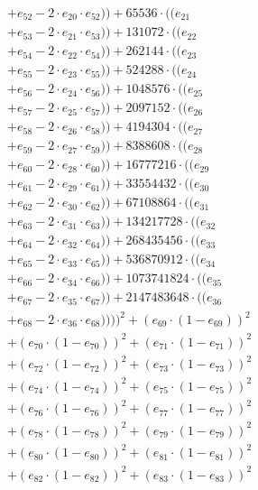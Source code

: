 \documentclass[10pt, a4paper]{article}
\begin{document}
\begin{align*}
& + e_{52} - 2 \cdot e_{20} \cdot e_{52})) + 65536 \cdot ((e_{21} \\
& + e_{53} - 2 \cdot e_{21} \cdot e_{53})) + 131072 \cdot ((e_{22} \\
& + e_{54} - 2 \cdot e_{22} \cdot e_{54})) + 262144 \cdot ((e_{23} \\
& + e_{55} - 2 \cdot e_{23} \cdot e_{55})) + 524288 \cdot ((e_{24} \\
& + e_{56} - 2 \cdot e_{24} \cdot e_{56})) + 1048576 \cdot ((e_{25} \\
& + e_{57} - 2 \cdot e_{25} \cdot e_{57})) + 2097152 \cdot ((e_{26} \\
& + e_{58} - 2 \cdot e_{26} \cdot e_{58})) + 4194304 \cdot ((e_{27} \\
& + e_{59} - 2 \cdot e_{27} \cdot e_{59})) + 8388608 \cdot ((e_{28} \\
& + e_{60} - 2 \cdot e_{28} \cdot e_{60})) + 16777216 \cdot ((e_{29} \\
& + e_{61} - 2 \cdot e_{29} \cdot e_{61})) + 33554432 \cdot ((e_{30} \\
& + e_{62} - 2 \cdot e_{30} \cdot e_{62})) + 67108864 \cdot ((e_{31} \\
& + e_{63} - 2 \cdot e_{31} \cdot e_{63})) + 134217728 \cdot ((e_{32} \\
& + e_{64} - 2 \cdot e_{32} \cdot e_{64})) + 268435456 \cdot ((e_{33} \\
& + e_{65} - 2 \cdot e_{33} \cdot e_{65})) + 536870912 \cdot ((e_{34} \\
& + e_{66} - 2 \cdot e_{34} \cdot e_{66})) + 1073741824 \cdot ((e_{35} \\
& + e_{67} - 2 \cdot e_{35} \cdot e_{67})) + 2147483648 \cdot ((e_{36} \\
& + e_{68} - 2 \cdot e_{36} \cdot e_{68}))))^{2} + (e_{69} \cdot (1 - e_{69}))^{2} \\
& + (e_{70} \cdot (1 - e_{70}))^{2} + (e_{71} \cdot (1 - e_{71}))^{2} \\
& + (e_{72} \cdot (1 - e_{72}))^{2} + (e_{73} \cdot (1 - e_{73}))^{2} \\
& + (e_{74} \cdot (1 - e_{74}))^{2} + (e_{75} \cdot (1 - e_{75}))^{2} \\
& + (e_{76} \cdot (1 - e_{76}))^{2} + (e_{77} \cdot (1 - e_{77}))^{2} \\
& + (e_{78} \cdot (1 - e_{78}))^{2} + (e_{79} \cdot (1 - e_{79}))^{2} \\
& + (e_{80} \cdot (1 - e_{80}))^{2} + (e_{81} \cdot (1 - e_{81}))^{2} \\
& + (e_{82} \cdot (1 - e_{82}))^{2} + (e_{83} \cdot (1 - e_{83}))^{2} \\

\end{align*}
\end{document}

